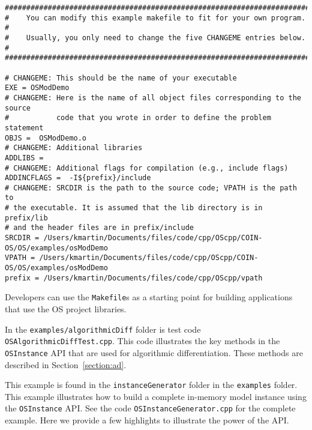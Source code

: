 \begin{verbatim}
##########################################################################
#    You can modify this example makefile to fit for your own program.   #
#    Usually, you only need to change the five CHANGEME entries below.   #
##########################################################################

# CHANGEME: This should be the name of your executable
EXE = OSModDemo
# CHANGEME: Here is the name of all object files corresponding to the source
#           code that you wrote in order to define the problem statement
OBJS =  OSModDemo.o
# CHANGEME: Additional libraries
ADDLIBS =
# CHANGEME: Additional flags for compilation (e.g., include flags)
ADDINCFLAGS =  -I${prefix}/include
# CHANGEME: SRCDIR is the path to the source code; VPATH is the path to
# the executable. It is assumed that the lib directory is in prefix/lib
# and the header files are in prefix/include
SRCDIR = /Users/kmartin/Documents/files/code/cpp/OScpp/COIN-OS/OS/examples/osModDemo
VPATH = /Users/kmartin/Documents/files/code/cpp/OScpp/COIN-OS/OS/examples/osModDemo
prefix = /Users/kmartin/Documents/files/code/cpp/OScpp/vpath
\end{verbatim}


Developers can use the {\tt Makefile}s as a starting point for building applications that use the 
OS project libraries.




\label{section:cppad}

In the {\tt examples/algorithmicDiff} folder is test code {\tt OSAlgorithmicDiffTest.cpp}. This code
illustrates the key methods in the {\tt OSInstance} API that are used for
algorithmic differentiation.   These methods are described in Section~\ref{section:ad}.



\label{section:exampleOSInstanceGeneration}

This example is found in the {\tt instanceGenerator} folder in the {\tt examples} folder. This example illustrates
how to build a complete in-memory model instance using the {\tt OSInstance} API.
See the code {\tt OSInstanceGenerator.cpp} for the complete example. Here we provide a few highlights to illustrate
the power of the API.

